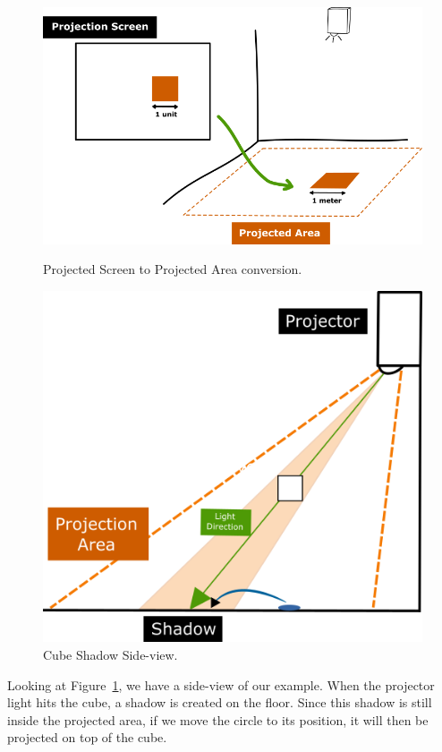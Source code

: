 \begin{figure}[!t]
  \centering
  \includegraphics[width=\linewidth]{imgs/impl/projection3}
    \caption{Projected Screen to Projected Area conversion.}
    \label{fig:projection3}
    \endminipage\hfill
{}
  \centering
  \includegraphics[width=\linewidth]{imgs/impl/projection5}
    \caption{Cube Shadow Side-view.}
    \label{fig:projection5}
    \endminipage
\end{figure}

Looking at Figure~\ref{fig:projection5}, we have a side-view of our example. When the projector light hits the cube, a shadow is created on the floor. 
Since this shadow is still inside the projected area, if we move the circle to its position, it will then be projected on top of the cube.

